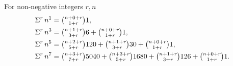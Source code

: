 \begin{example}
  For non-negative integers $r,n$
  \begin{align*}
    \Sigma^{r}\,{n}^{1} &= \tbinom{n+0+r}{1+r} 1, \\
    \Sigma^{r}\,{n}^{3} &= \tbinom{n+1+r}{3+r} 6    + \tbinom{n+0+r}{1+r} 1, \\
    \Sigma^{r}\,{n}^{5} &= \tbinom{n+2+r}{5+r} 120  + \tbinom{n+1+r}{3+r} 30   + \tbinom{n+0+r}{1+r} 1, \\
    \Sigma^{r}\,{n}^{7} &= \tbinom{n+3+r}{7+r} 5040 + \tbinom{n+3+r}{5+r} 1680 + \tbinom{n+1+r}{3+r} 126 + \tbinom{n+0+r}{1+r} 1.
  \end{align*}
\end{example}
